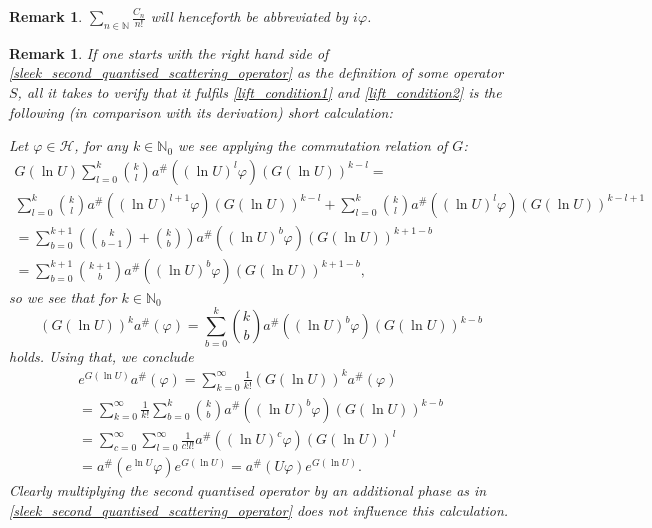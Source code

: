 \documentclass[b5paper,draft,openbib,12pt]{memoir}
\newtheorem{Remark}[Def]{Remark}
\begin{document}
\begin{Remark}
\(\sum_{n\in\mathbb{N}} \frac{C_n}{n!}\) will henceforth be abbreviated by \(i \varphi\).
\end{Remark}

\begin{Remark}
If one starts with the right hand side of \eqref{sleek_second_quantised_scattering_operator} as the definition of 
some operator \(S\), all it takes to verify that it fulfils \eqref{lift_condition1} and \eqref{lift_condition2} is the following 
(in comparison with its derivation) short calculation:

Let \(\varphi\in \mathcal{H}\), for any \(k\in \mathbb{N}_0\) we see applying the commutation relation of \(G\):
\begin{multline*}
G(\ln U) \sum_{l=0}^k \binom{k}{l} a^\# \left(\left(\ln U\right)^l \varphi \right) \left(G(\ln U)\right)^{k-l} = \\
\sum_{l=0}^k \binom{k}{l} a^\# \left(\left(\ln U\right)^{l+1} \varphi \right) \left(G(\ln U)\right)^{k-l}
+\sum_{l=0}^k \binom{k}{l} a^\# \left(\left(\ln U\right)^l \varphi \right) \left(G(\ln U)\right)^{k-l+1}\\
= \sum_{b=0}^{k+1} \left( \binom{k}{b-1} + \binom{k}{b}\right) a^\#\left( (\ln U)^b \varphi\right) \left( G(\ln U)\right)^{k+1-b}\\
=\sum_{b=0}^{k+1}  \binom{k+1}{b}  a^\#\left( (\ln U)^b \varphi\right) \left( G(\ln U)\right)^{k+1-b},
\end{multline*}
so we see that for \(k\in\mathbb{N}_0\)
\begin{equation}
\left(G(\ln U)\right)^k a^\# (\varphi) = \sum_{b=0}^{k}  \binom{k}{b}  a^\#\left( (\ln U)^b \varphi\right) \left( G(\ln U)\right)^{k-b}
\end{equation}
holds. Using that, we conclude
\begin{multline*}
e^{G(\ln U)}a^\#(\varphi) = \sum_{k=0}^\infty \frac{1}{k!} \left(G(\ln U)\right)^k a^\# (\varphi)\\
=\sum_{k=0}^\infty \frac{1}{k!}  \sum_{b=0}^{k}  \binom{k}{b}  a^\#\left( (\ln U)^b \varphi \right) \left( G(\ln U)\right)^{k-b}\\
=\sum_{c=0}^\infty \sum_{l=0}^\infty \frac{1}{c! l!} a^\#\left( (\ln U)^c \varphi \right) \left( G(\ln U)\right)^{l}\\
=a^\#\left( e^{\ln U} \varphi \right) e^{G( \ln U)}=a^\#\left( U \varphi \right) e^{G( \ln U)}.
\end{multline*}
Clearly multiplying the second quantised operator by an additional phase as in 
\eqref{sleek_second_quantised_scattering_operator} does not influence this calculation.
\end{Remark}
\end{document}
